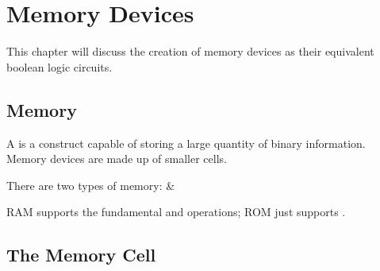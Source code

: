\chapter{Memory Devices}

This chapter will discuss the creation of memory devices as their equivalent boolean logic circuits.

\section{Memory}

A  is a construct capable of storing a large quantity of binary information. Memory devices are made up of smaller cells.
\begin{bullets}
	\item There are two types of memory:  \& 
	\item  RAM supports the fundamental  and  operations; ROM just supports .
\end{bullets}

\section{The Memory Cell}

